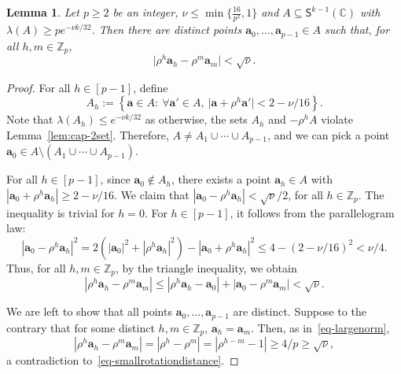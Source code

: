 \documentclass[11pt, a4paper]{article}
\newcommand{\V}[1]{\mathbold{#1}}
\newtheorem{lemma}[theorem]{Lemma}
\theoremstyle{definition}
\newcommand{\sS}{\mathsf{S}}
\newcommand{\sC}{\mathbb{C}}
\newcommand{\sZ}{\mathbb{Z}}
\newcommand*{\bigabs}[1]{\bigl|#1\bigr|}
\begin{document}
\begin{lemma}\label{lem-closebyrotations}
	Let $p\ge 2$ be an integer, $\nu\le \min\{\frac{16}{p^2},1\}$ and $A\subseteq \sS^{k-1}(\sC)$ with $\lambda(A)\ge pe^{-\nu k/32}$. Then there are distinct points $\V{a}_0,\ldots,\V{a}_{p-1}\in A$ such that, for all $h,m\in \sZ_p$,
	$$\bigabs{\rho^h\V{a}_h-\rho^m\V{a}_m}<\sqrt{\nu}.$$
\end{lemma}
\begin{proof}
	For all $h\in [p-1]$, define 
	$$
	A_h:=\left\{\V{a}\in A:~\forall \V{a}'\in A,~\bigabs{\V{a}+\rho^h\V{a}'}< 2-\nu/16 \right\}.
	$$
	Note that $\lambda(A_h)\le e^{-\nu k/32}$ as otherwise, the sets $A_h$ and $-\rho^hA$ violate Lemma~\ref{lem:cap-2set}. Therefore, $A\neq A_1\cup\cdots\cup A_{p-1}$, and we can pick a point $\V{a}_0\in A\setminus(A_1\cup\cdots\cup A_{p-1})$. 
	
	For all $h\in [p-1]$, since $\V{a}_0\notin A_h$, there exists a point $\V{a}_h\in A$
	with  $|\V{a}_0+\rho^h\V{a}_h|\ge 2-\nu/16$. We claim that $|\V{a}_0-\rho^h\V{a}_h|<\sqrt{\nu}/2$, for all $h\in \sZ_p$. The inequality is trivial for $h=0$. For $h\in [p-1]$, it follows from the parallelogram law:
	\begin{equation*}
		|\V{a}_0-\rho^h\V{a}_h|^2=  2(|\V{a}_0|^2+|\rho^h\V{a}_h|^2)-|\V{a}_0+\rho^h\V{a}_h|^2\le 4-(2-\nu/16)^2<\nu/4.
	\end{equation*}
	Thus, for all $h,m\in \sZ_p$, by the triangle inequality, we obtain
	\begin{equation}\label{eq-smallrotationdistance}
		|\rho^h\V{a}_h-\rho^m\V{a}_m|\le|\rho^h\V{a}_h-\V{a}_0|+|\V{a}_0-\rho^m\V{a}_m|<\sqrt{\nu}.
	\end{equation}

	We are left to show that all points $\V{a}_0,\ldots, \V{a}_{p-1}$ are distinct. Suppose to the contrary that for some distinct $h,m\in \sZ_p$, $\V{a}_h=\V{a}_m$. Then, as in~\eqref{eq-largenorm},
	\begin{equation*}
		|\rho^h\V{a}_h-\rho^m\V{a}_m|=|\rho^h-\rho^m|=|\rho^{h-m}-1|\ge  4/p\ge \sqrt{\nu},
	\end{equation*}   
	a contradiction to~\eqref{eq-smallrotationdistance}.
\end{proof}
\end{document}
